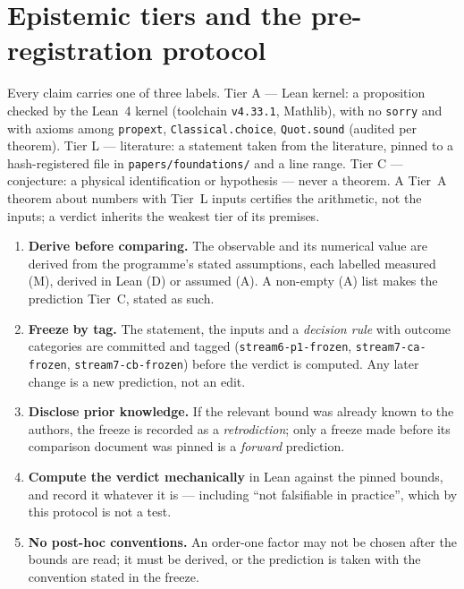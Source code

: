 \documentclass[11pt,a4paper]{article}
\theoremstyle{remark}
\newcommand{\tierA}{\colorbox{green!15}{\textsf{\scriptsize Tier A --- Lean kernel}}}
\newcommand{\tierL}{\colorbox{blue!10}{\textsf{\scriptsize Tier L --- literature}}}
\newcommand{\tierC}{\colorbox{orange!15}{\textsf{\scriptsize Tier C --- conjecture}}}
\begin{document}
\section{Epistemic tiers and the pre-registration protocol}
\label{sec:protocol}

Every claim carries one of three labels. \tierA: a proposition checked by the Lean~4 kernel (toolchain
\texttt{v4.33.1}, Mathlib), with no \texttt{sorry} and with axioms among \texttt{propext},
\texttt{Classical.choice}, \texttt{Quot.sound} (audited per theorem). \tierL: a statement taken from the
literature, pinned to a hash-registered file in \texttt{papers/foundations/} and a line range. \tierC: a
physical identification or hypothesis --- never a theorem. A Tier~A theorem about numbers with Tier~L
inputs certifies the arithmetic, not the inputs; a verdict inherits the weakest tier of its premises.

\begin{protocolbox}
\begin{enumerate}
\item \textbf{Derive before comparing.} The observable and its numerical value are derived from the
  programme's stated assumptions, each labelled measured (M), derived in Lean (D) or assumed (A). A non-empty
  (A) list makes the prediction Tier~C, stated as such.
\item \textbf{Freeze by tag.} The statement, the inputs and a \emph{decision rule} with outcome categories are
  committed and tagged (\texttt{stream6-p1-frozen}, \texttt{stream7-ca-frozen}, \texttt{stream7-cb-frozen})
  before the verdict is computed. Any later change is a new prediction, not an edit.
\item \textbf{Disclose prior knowledge.} If the relevant bound was already known to the authors, the freeze
  is recorded as a \emph{retrodiction}; only a freeze made before its comparison document was pinned is a
  \emph{forward} prediction.
\item \textbf{Compute the verdict mechanically} in Lean against the pinned bounds, and record it whatever it
  is --- including ``not falsifiable in practice'', which by this protocol is not a test.
\item \textbf{No post-hoc conventions.} An order-one factor may not be chosen after the bounds are read; it
  must be derived, or the prediction is taken with the convention stated in the freeze.
\end{enumerate}
\end{protocolbox}
\end{document}
